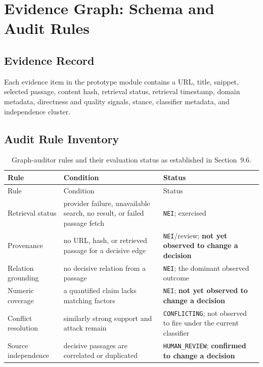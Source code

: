 \documentclass[12pt,a4paper,openany]{report}
\begin{document}
\appendix
\chapter{Evidence Graph: Schema and Audit Rules}
\section{Evidence Record}
Each evidence item in the prototype module contains a URL, title, snippet, selected passage, content hash, retrieval status, retrieval timestamp, domain metadata, directness and quality signals, stance, classifier metadata, and independence cluster.

\section{Audit Rule Inventory}
\begin{longtable}{p{3.3cm}p{5.3cm}p{5cm}}
\caption{Graph-auditor rules and their evaluation status as established in Section~9.6.}\\
\toprule Rule & Condition & Status \\
\midrule
\endfirsthead
\toprule Rule & Condition & Status \\
\midrule
\endhead
Retrieval status & provider failure, unavailable search, no result, or failed passage fetch & \texttt{NEI}; exercised \\
Provenance & no URL, hash, or retrieved passage for a decisive edge & \texttt{NEI}/review; \textbf{not yet observed to change a decision} \\
Relation grounding & no decisive relation from a passage & \texttt{NEI}; the dominant observed outcome \\
Numeric coverage & a quantified claim lacks matching factors & \texttt{NEI}; \textbf{not yet observed to change a decision} \\
Conflict resolution & similarly strong support and attack remain & \texttt{CONFLICTING}; not observed to fire under the current classifier \\
Source independence & decisive passages are correlated or duplicated & \texttt{HUMAN\_REVIEW}; \textbf{confirmed to change a decision} \\
\bottomrule
\end{longtable}
\end{document}
